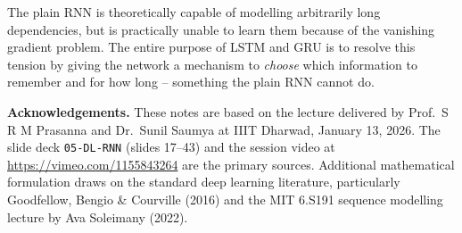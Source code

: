 \documentclass[12pt,a4paper]{article}
\begin{document}
\begin{keyinsight}[title=The Central Tension of Plain RNNs]
The plain RNN is theoretically capable of modelling arbitrarily long
dependencies, but is practically unable to learn them because of the vanishing
gradient problem.  The entire purpose of LSTM and GRU is to resolve this
tension by giving the network a mechanism to \emph{choose} which information to
remember and for how long -- something the plain RNN cannot do.
\end{keyinsight}

\vspace{1cm}
\noindent\textbf{Acknowledgements.}  These notes are based on the lecture
delivered by Prof.\ S R M Prasanna and Dr.\ Sunil Saumya at IIIT Dharwad,
January 13, 2026.  The slide deck \texttt{05-DL-RNN} (slides 17--43) and the
session video at \url{https://vimeo.com/1155843264} are the primary sources.
Additional mathematical formulation draws on the standard deep learning
literature, particularly Goodfellow, Bengio \& Courville (2016) and the MIT
6.S191 sequence modelling lecture by Ava Soleimany (2022).

\clearpage
\end{document}
